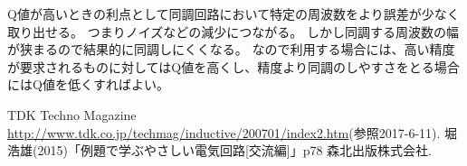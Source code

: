 \documentclass[11pt,a4paper,fleqn]{jsarticle}
\begin{document}
Q値が高いときの利点として同調回路において特定の周波数をより誤差が少なく取り出せる。
つまりノイズなどの減少につながる。
しかし同調する周波数の幅が狭まるので結果的に同調しにくくなる。
なので利用する場合には、高い精度が要求されるものに対してはQ値を高くし、精度より同調のしやすさをとる場合にはQ値を低くすればよい。
%

\begin{thebibliography}{99}
 TDK Techno Magazine \url{http://www.tdk.co.jp/techmag/inductive/200701/index2.htm}(参照2017-6-11).
 堀浩雄(2015)「例題で学ぶやさしい電気回路[交流編]」p78 森北出版株式会社.
\end{thebibliography}
\end{document}
